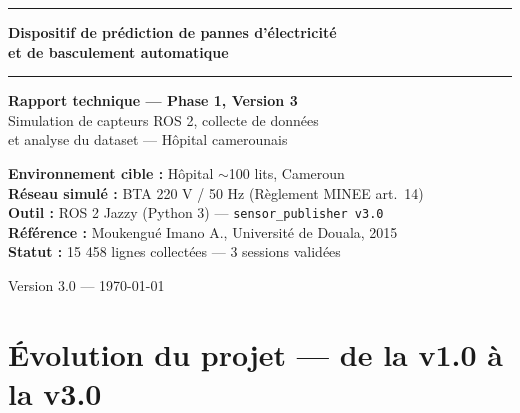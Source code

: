 \documentclass[12pt,a4paper]{article}
\begin{document}

\begin{titlepage}
  \centering
  \vspace*{1.5cm}
  {\color{bleuCMR}\rule{\linewidth}{2pt}}
  \vspace{0.4cm}

  {\LARGE\bfseries Dispositif de prédiction de pannes d'électricité\\
  et de basculement automatique}

  \vspace{0.3cm}
  {\color{bleuCMR}\rule{\linewidth}{0.8pt}}
  \vspace{1cm}

  {\large\bfseries Rapport technique — Phase 1, Version 3}\\
  \vspace{0.3cm}
  {\large Simulation de capteurs ROS 2, collecte de données\\
  et analyse du dataset — Hôpital camerounais}

  \vspace{1.5cm}
  \begin{mdframed}[style=encadre]
    \centering
    \textbf{Environnement cible :} Hôpital $\sim$100 lits, Cameroun\\
    \textbf{Réseau simulé :} BTA 220 V / 50 Hz (Règlement MINEE art.\ 14)\\
    \textbf{Outil :} ROS 2 Jazzy (Python 3) — \texttt{sensor\_publisher v3.0}\\
    \textbf{Référence :} Moukengué Imano A., Université de Douala, 2015\\
    \textbf{Statut :} 15 458 lignes collectées — 3 sessions validées
  \end{mdframed}

  \vfill
  {\small Version 3.0 — \today}
\end{titlepage}

\tableofcontents
\newpage

\section{Évolution du projet — de la v1.0 à la v3.0}
\end{document}
